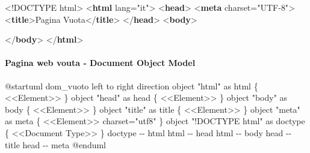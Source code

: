 \documentclass[
]{article}
\newenvironment{Shaded}{}{}
\newcommand{\DataTypeTok}[1]{\textcolor[rgb]{0.56,0.13,0.00}{#1}}
\newcommand{\KeywordTok}[1]{\textcolor[rgb]{0.00,0.44,0.13}{\textbf{#1}}}
\newcommand{\NormalTok}[1]{#1}
\newcommand{\OperatorTok}[1]{\textcolor[rgb]{0.40,0.40,0.40}{#1}}
\newcommand{\OtherTok}[1]{\textcolor[rgb]{0.00,0.44,0.13}{#1}}
\newcommand{\StringTok}[1]{\textcolor[rgb]{0.25,0.44,0.63}{#1}}
\begin{document}
\begin{Shaded}
\begin{Highlighting}[]
\DataTypeTok{\textless{}!DOCTYPE}\NormalTok{ html}\DataTypeTok{\textgreater{}}
\DataTypeTok{\textless{}}\KeywordTok{html}\OtherTok{ lang}\OperatorTok{=}\StringTok{"it"}\DataTypeTok{\textgreater{}}
\DataTypeTok{\textless{}}\KeywordTok{head}\DataTypeTok{\textgreater{}}
    \DataTypeTok{\textless{}}\KeywordTok{meta}\OtherTok{ charset}\OperatorTok{=}\StringTok{"UTF{-}8"}\DataTypeTok{\textgreater{}}
    \DataTypeTok{\textless{}}\KeywordTok{title}\DataTypeTok{\textgreater{}}\NormalTok{Pagina Vuota}\DataTypeTok{\textless{}/}\KeywordTok{title}\DataTypeTok{\textgreater{}}
\DataTypeTok{\textless{}/}\KeywordTok{head}\DataTypeTok{\textgreater{}}
\DataTypeTok{\textless{}}\KeywordTok{body}\DataTypeTok{\textgreater{}}

\DataTypeTok{\textless{}/}\KeywordTok{body}\DataTypeTok{\textgreater{}}
\DataTypeTok{\textless{}/}\KeywordTok{html}\DataTypeTok{\textgreater{}}
\end{Highlighting}
\end{Shaded}

\paragraph{Pagina web vouta - Document Object
Model}\label{pagina-web-vouta---document-object-model}

\begin{Shaded}
\begin{Highlighting}[]
\NormalTok{@startuml dom\_vuoto}
\NormalTok{left to right direction}
\NormalTok{object "html" as html \{}
\NormalTok{  \textless{}\textless{}Element\textgreater{}\textgreater{}}
\NormalTok{\}}
\NormalTok{object "head" as head \{}
\NormalTok{  \textless{}\textless{}Element\textgreater{}\textgreater{}}
\NormalTok{\}}
\NormalTok{object "body" as body \{}
\NormalTok{  \textless{}\textless{}Element\textgreater{}\textgreater{}}
\NormalTok{\}}
\NormalTok{object "title" as title \{}
\NormalTok{  \textless{}\textless{}Element\textgreater{}\textgreater{}}
\NormalTok{\}}
\NormalTok{object "meta" as meta \{}
\NormalTok{  \textless{}\textless{}Element\textgreater{}\textgreater{}}
\NormalTok{  charset="utf8"}
\NormalTok{\}}
\NormalTok{object "!DOCTYPE html" as doctype \{}
\NormalTok{  \textless{}\textless{}Document Type\textgreater{}\textgreater{}}
\NormalTok{\}}
\NormalTok{doctype {-}{-} html}
\NormalTok{html {-}{-} head}
\NormalTok{html {-}{-} body}
\NormalTok{head {-}{-} title}
\NormalTok{head {-}{-} meta}
\NormalTok{@enduml}
\end{Highlighting}
\end{Shaded}
\end{document}
